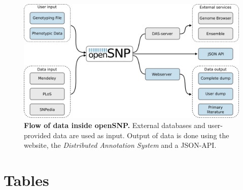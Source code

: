 \documentclass[10pt]{article}
\begin{document}
\begin{figure}[!ht]
	\begin{center}
		\includegraphics[scale=0.60]{uml_diagram.png}
	\end{center}
	\caption{
	{\bf Flow of data inside openSNP.} External databases and user-provided data are used as input. Output of data is done using the website, the \emph{Distributed Annotation System} and a JSON-API.} 
	\label{Figure4_label}
\end{figure}





\section*{Tables}
\end{document}
